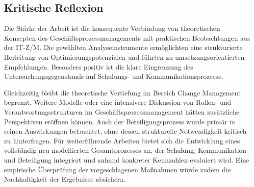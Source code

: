 \documentclass[
    12pt, 
    a4paper,
    ]{scrartcl} %
\begin{document}
\subsection{Kritische Reflexion}
Die Stärke der Arbeit ist die konsequente Verbindung von theoretischen Konzepten des Geschäftsprozessmanagements mit praktischen Beobachtungen aus der IT-Z/M. Die gewählten Analyseinstrumente ermöglichten eine strukturierte Herleitung von Optimierungspotenzialen und führten zu umsetzungsorientierten Empfehlungen. Besonders positiv ist die klare Eingrenzung des Untersuchungsgegenstands auf Schulungs- und Kommunikationsprozesse.

Gleichzeitig bleibt die theoretische Vertiefung im Bereich Change Management begrenzt. Weitere Modelle oder eine intensivere Diskussion von Rollen- und Verantwortungsstrukturen im Geschäftsprozessmanagement hätten zusätzliche Perspektiven eröffnen können. Auch der Beteiligungsprozess wurde primär in seinen Auswirkungen betrachtet, ohne dessen strukturelle Notwendigkeit kritisch zu hinterfragen. Für weiterführende Arbeiten bietet sich die Entwicklung eines vollständig neu modellierten Gesamtprozesses an, der Schulung, Kommunikation und Beteiligung integriert und anhand konkreter Kennzahlen evaluiert wird. Eine empirische Überprüfung der vorgeschlagenen Maßnahmen würde zudem die Nachhaltigkeit der Ergebnisse absichern.


\end{document}

